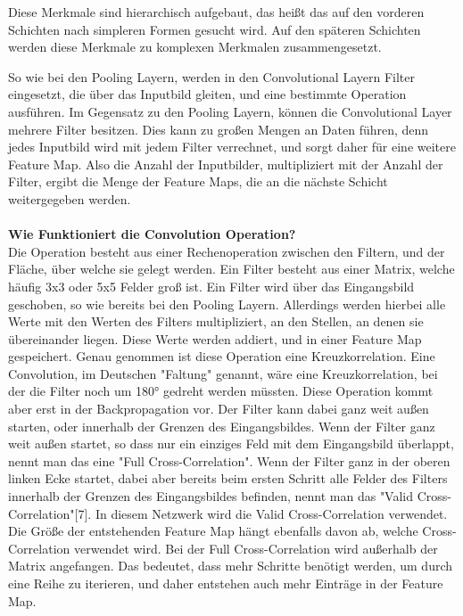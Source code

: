 \documentclass[12pt]{article}
\begin{document}
Diese Merkmale sind hierarchisch aufgebaut, das heißt das auf den vorderen Schichten nach simpleren Formen gesucht wird. Auf den späteren Schichten werden diese Merkmale zu komplexen Merkmalen zusammengesetzt.

So wie bei den Pooling Layern, werden in den Convolutional Layern Filter eingesetzt, die über das Inputbild gleiten, und eine bestimmte Operation ausführen. Im Gegensatz zu den Pooling Layern, können die Convolutional Layer mehrere Filter besitzen. Dies kann zu großen Mengen an Daten führen, denn jedes Inputbild wird mit jedem Filter verrechnet, und sorgt daher für eine weitere Feature Map. Also die Anzahl der Inputbilder, multipliziert mit der Anzahl der Filter, ergibt die Menge der Feature Maps, die an die nächste Schicht weitergegeben werden.
\\
\\
\textbf{Wie Funktioniert die Convolution Operation?}\\
Die Operation besteht aus einer Rechenoperation zwischen den Filtern, und der Fläche, über welche sie gelegt werden. Ein Filter besteht aus einer Matrix, welche häufig 3x3 oder 5x5 Felder groß ist. 
Ein Filter wird über das Eingangsbild geschoben, so wie bereits bei den Pooling Layern. Allerdings werden hierbei alle Werte mit den Werten des Filters multipliziert, an den Stellen, an denen sie übereinander liegen. Diese Werte werden addiert, und in einer Feature Map gespeichert.
Genau genommen ist diese Operation eine Kreuzkorrelation. Eine Convolution, im Deutschen "Faltung" genannt, wäre eine Kreuzkorrelation, bei der die Filter noch um 180° gedreht werden müssten. Diese Operation kommt aber erst in der Backpropagation vor.
Der Filter kann dabei ganz weit außen starten, oder innerhalb der Grenzen des Eingangsbildes. Wenn der Filter ganz weit außen startet, so dass nur ein einziges Feld mit dem Eingangsbild überlappt, nennt man das eine "Full Cross-Correlation". Wenn der Filter ganz in der oberen linken Ecke startet, dabei aber bereits beim ersten Schritt alle Felder des Filters innerhalb der Grenzen des Eingangsbildes befinden, nennt man das "Valid Cross-Correlation"[7].
In diesem Netzwerk wird die Valid Cross-Correlation verwendet. Die Größe der entstehenden Feature Map hängt ebenfalls davon ab, welche Cross-Correlation verwendet wird. 
Bei der Full Cross-Correlation wird außerhalb der Matrix angefangen. Das bedeutet, dass mehr Schritte benötigt werden, um durch eine Reihe zu iterieren, und daher entstehen auch mehr Einträge in der Feature Map.
\end{document}
